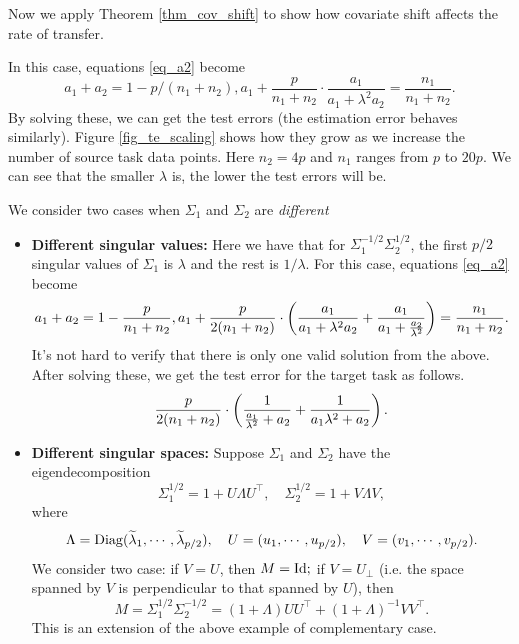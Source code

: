 \medskip
Now we apply Theorem \ref{thm_cov_shift} to show how covariate shift affects the rate of transfer.


\smallskip
\begin{example}[\textbf{When $\Sigma_1 = \Sigma_2 / \lambda$}]
In this case, equations \eqref{eq_a2} become
\[ a_1 + a_2 = 1 - p/(n_1 + n_2), a_1 + \frac{p}{n_1 + n_2} \cdot \frac {a_1} {a_1 + \lambda^2 a_2} = \frac{n_1} {n_1 + n_2}. \]
By solving these, we can get the test errors (the estimation error behaves similarly).
Figure \ref{fig_te_scaling} shows how they grow as we increase the number of source task data points.
Here $n_2 = 4p$ and $n_1$ ranges from $p$ to $20p$.
We can see that the smaller $\lambda$ is, the lower the test errors will be.
\end{example}

\smallskip
\begin{example}
	We consider two cases when $\Sigma_1$ and $\Sigma_2$ are \textit{different}
\begin{itemize}
	\item {\bf Different singular values:} Here we have that for $\Sigma_1^{-1/2}\Sigma_2^{1/2}$, the first $p/2$ singular values of $\Sigma_1$ is $\lambda$ and the rest is $1/\lambda$.
For this case, equations \eqref{eq_a2} become
\[ a_1 + a_2 = 1 - \frac{p}{n_1 + n_2}, a_1 + \frac{p}{2(n_1 + n_2)}\cdot \left({\frac{a_1}{a_1 + \lambda^2 a_2} + \frac{a_1}{a_1 + \frac{a_2}{\lambda^2}}}\right) = \frac{n_1}{n_1 + n_2}. \]
It's not hard to verify that there is only one valid solution from the above.
After solving these, we get the test error for the target task as follows.
\[ \frac{p}{2(n_1 + n_2)} \cdot \left({\frac{1}{\frac{a_1}{\lambda^2} + a_2} + \frac{1}{a_1\lambda^2 + a_2}}\right).\]
	\item {\bf Different singular spaces:}
	Suppose $\Sigma_1$ and $\Sigma_2$ have the eigendecomposition
$$\Sigma_1^{1/2} = 1+ U\Lambda U^\top, \quad \Sigma_2^{1/2} = 1+ V\Lambda V,$$
where
$$\Lambda = \operatorname{Diag}(\widetilde\lambda_1,\cdots, \widetilde\lambda_{p/2}), \quad U= (u_1,\cdots, u_{p/2}), \quad V= (v_1,\cdots, v_{p/2}).$$
We consider two case: if $V=U$, then $M=\operatorname{Id};$ if $V=U_\perp$ (i.e. the space spanned by $V$ is perpendicular to that spanned by $U$), then
$$M=\Sigma_1^{1/2} \Sigma_2^{-1/2}=(1+\Lambda)UU^\top + (1+\Lambda)^{-1}V V^\top .$$
This is an extension of the above example of complementary case.
\end{itemize}
\end{example}



